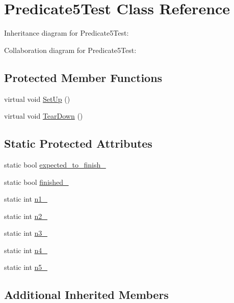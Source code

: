 \hypertarget{class_predicate5_test}{}\section{Predicate5\+Test Class Reference}
\label{class_predicate5_test}


Inheritance diagram for Predicate5\+Test\+:


Collaboration diagram for Predicate5\+Test\+:
\subsection*{Protected Member Functions}
\begin{DoxyCompactItemize}
\item 
virtual void \hyperlink{class_predicate5_test_a42bf622b4f2134d0497cd42fd2e3e1df}{Set\+Up} ()
\item 
virtual void \hyperlink{class_predicate5_test_ab7bc4521d96174d5ef96156edc15444d}{Tear\+Down} ()
\end{DoxyCompactItemize}
\subsection*{Static Protected Attributes}
\begin{DoxyCompactItemize}
\item 
static bool \hyperlink{class_predicate5_test_aa502b7a330cc5c64785ff59aad3ef180}{expected\+\_\+to\+\_\+finish\+\_\+}
\item 
static bool \hyperlink{class_predicate5_test_a5003aada64accf06cdb28b1ff1797353}{finished\+\_\+}
\item 
static int \hyperlink{class_predicate5_test_a356c8e361185b234a417ed895eb14e38}{n1\+\_\+}
\item 
static int \hyperlink{class_predicate5_test_a5bf48ba65b7baf20abe1d2af90779ce0}{n2\+\_\+}
\item 
static int \hyperlink{class_predicate5_test_a63723efb915dbf418c31b97b64dabc0e}{n3\+\_\+}
\item 
static int \hyperlink{class_predicate5_test_a5d66aa58badddc8d3d8070a93c0558d6}{n4\+\_\+}
\item 
static int \hyperlink{class_predicate5_test_a96badba6366235a2771b27ea014bd9ce}{n5\+\_\+}
\end{DoxyCompactItemize}
\subsection*{Additional Inherited Members}


